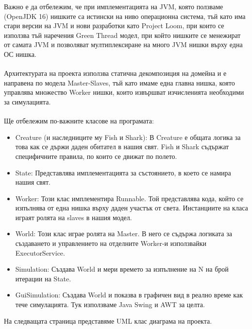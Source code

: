 \documentclass{article}
\begin{document}
Важно е да отбележим, че при имплементацията на JVM, която ползваме (OpenJDK 16) нишките са истински
на ниво операционна система, тъй като има стари версии на JVM и нови разработки като Project Loom,
при които се използва тъй наречения Green Thread модел, при който нишките се менежират от самата JVM
и позволяват мултиплексиране на много JVM нишки върху една ОС нишка.
\\
\\
Архитектурата на проекта използва статична декомпозиция на домейна и е направена по модела Master-Slaves,
тъй като имаме една главна нишка, която управлява множество Worker нишки, които извършват изчисленията
необходими за симулацията.
\\
\\
Ще отбележим по-важните класове на програмата:
\begin{itemize}
	\item Creature (и наследниците му Fish и Shark): В Creature е общата логика за това как се държи
		даден обитател в нашия свят. Fish и Shark съдържат специфичните правила, по които се движат
		по полето.
	\item State: Представлява имплементацията за състоянието, в което се намира нашия свят.
	\item Worker: Този клас имплементира Runnable. Той представлява кода, който се изпълнява от една нишка
		върху даден участък от света. Инстанциите на класа играят ролята на slaves в нашия модел.
	\item World: Този клас играе ролята на Master. В него се съдържа логиката за създаването и управлението на отделните
		Worker-и използвайки ExecutorService.
	\item Simulation: Създава World и мери времето за изпълнение на N на брой итерации на State.
	\item GuiSimulation: Създава World и показва в графичен вид в реално време как тече симулацията.
		Тук използваме Java Swing и AWT за целта.
\end{itemize}

На следващата страница представяме UML клас диаграма на проекта.
\end{document}
